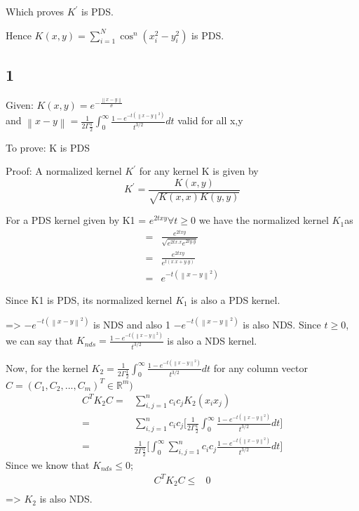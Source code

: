 \documentclass{article}
\begin{document}
\begin{description}
    Which proves \( K^{'} \) is PDS. 


    Hence \( K(x,y) = \sum_{i=1}^{N} \cos^{n} (x_{i}^{2} - y_{i}^{2} ) \) is PDS.
\end{description}

\subsection*{1}
\begin{description}
  \item{Given:} \( K(x,y) = e^{-\frac{ \left\lVert x - y \right\rVert }{\sigma}} \) \\
    and \( \left\lVert x - y \right\rVert  = \frac{1}{2\Gamma{\frac{1}{2}}} \int_{0}^{\infty} \frac{1 - e^{-t(\left\lVert x - y \right\rVert^{2})} }{ t^{3/2}} dt \) valid for all x,y
  \item{To prove:} K is PDS
  \item{Proof:}
    A normalized kernel $K^{'}$ for any kernel K is given by
    \begin{equation*}
      K^{'} = \frac{K(x,y)}{\sqrt{K(x,x) K(y,y)}}
    \end{equation*}

    For a PDS kernel given by K1 = $e^{2txy} \forall t \ge 0$ we have the normalized kernel $K_{1}$as 
    \begin{align}
      =& \frac{e^{2txy}}{\sqrt{e^{2tx.x}e^{2ty.y}}} \\
      =& \frac{e^{2txy}}{e^{t(x.x + y.y)}} \\
      =& e^{-t(\left\lVert x - y \right\rVert^{2})}
    \end{align}

    Since K1 is PDS, its normalized kernel $K_{1} $ is also a PDS kernel.

    => $-e^{-t(\left\lVert x - y \right\rVert^{2})}$ is NDS and also 1 $-e^{-t(\left\lVert x - y \right\rVert^{2})}$ is also NDS.  Since $ t \ge 0$, we can say that $ K_{nds} = \frac{1 - e^{-t(\left\lVert x - y \right\rVert^{2})}}{t^{3/2}}$ is also a NDS kernel.

    Now, for the kernel $K_{2} = \frac{1}{2\Gamma{\frac{1}{2}}} \int_{0}^{\infty} \frac{1 - e^{-t(\left\lVert x - y \right\rVert^{2})} }{ t^{3/2}} dt$
    for any column vector \( C = (C_{1}, C_{2}, ...  ,C_{m})^{T} \in \mathbb{R}^{m} ) \)
    \begin{align*}
      C^{T}K_{2}C =& \sum_{i,j=1}^{n} c_{i}c_{j} K_{2}(x_{i}x_{j}) \\
      =& \sum_{i,j=1}^{n} c_{i}c_{j} \bigl[ \frac{1}{2\Gamma{\frac{1}{2}}} \int_{0}^{\infty} \frac{1 - e^{-t(\left\lVert x - y \right\rVert^{2})} }{ t^{3/2}} dt \bigr] \\
      =& \frac{1}{2\Gamma{\frac{1}{2}}} \bigl[ \int_{0}^{\infty} \sum_{i,j=1}^{n} c_{i}c_{j} \frac{1 - e^{-t(\left\lVert x - y \right\rVert^{2})} }{ t^{3/2}} dt \bigr] 
    \end{align*}
    Since we know that $K_{nds} \le 0$; 
    \begin{align*}
      C^{T}K_{2}C \le& 0 \\
    \end{align*}
    => $K_{2}$ is also NDS.


\end{description}
\end{document}
